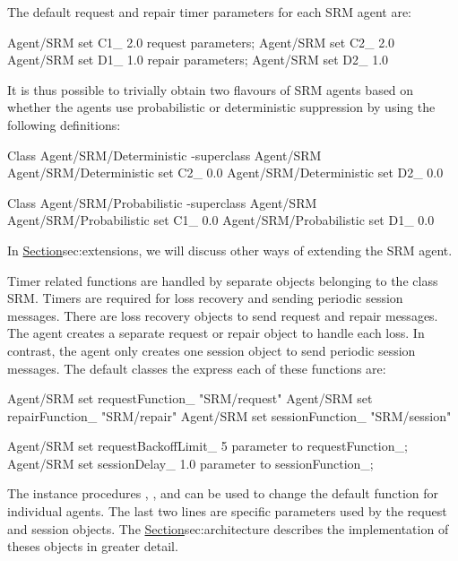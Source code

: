 The default request and repair timer parameters \cite{Floy95:Reliable}
for each SRM agent are:
\begin{program}
        Agent/SRM set C1_       2.0 \; request parameters;
        Agent/SRM set C2_       2.0
        Agent/SRM set D1_       1.0 \; repair parameters;
        Agent/SRM set D2_       1.0
\end{program}
It is thus possible to trivially obtain two flavours of SRM agents
based on whether the agents use probabilistic or deterministic
suppression by using the following definitions:
\begin{program}
        Class Agent/SRM/Deterministic -superclass Agent/SRM
        Agent/SRM/Deterministic set C2_ 0.0
        Agent/SRM/Deterministic set D2_ 0.0

        Class Agent/SRM/Probabilistic -superclass Agent/SRM
        Agent/SRM/Probabilistic set C1_ 0.0
        Agent/SRM/Probabilistic set D1_ 0.0
\end{program}
In \href{a later section}{Section}{sec:extensions},
we will discuss other ways of extending the SRM agent.

Timer related functions are handled by separate objects
belonging to the class  SRM.
Timers are required for loss recovery and sending periodic session messages.
There are loss recovery objects to send request and repair messages.
The agent creates a separate request or repair object to handle each loss.
In contrast, the agent only creates one session object to send
periodic session messages.
The default classes the express each of these functions are:
\begin{program}
        Agent/SRM set requestFunction_  "SRM/request"
        Agent/SRM set repairFunction_   "SRM/repair"
        Agent/SRM set sessionFunction_  "SRM/session"

        Agent/SRM set requestBackoffLimit_      5       \; parameter to requestFunction_;
        Agent/SRM set sessionDelay_             1.0     \; parameter to sessionFunction_;
\end{program}
The instance procedures
,
,
and
can be used to change the default function for individual agents.
The last two lines are specific parameters used by the request 
and session objects.
The \href{following section}{Section}{sec:architecture}
describes the implementation of theses objects in greater detail.

